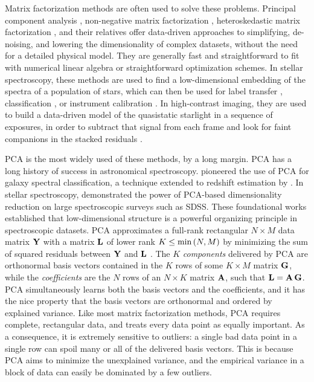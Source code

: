 \documentclass[onecolumn,floatfix,linenumbers,trackchanges]{aastex631}
\begin{document}
Matrix factorization methods are often used to solve these problems. Principal component analysis \citep[PCA;][]{pearson1901, hotelling1933}, non-negative matrix factorization \citep{lee1999}, heteroskedastic matrix factorization \citep{tsalmantza2012}, and their relatives offer data-driven approaches to simplifying, de-noising, and lowering the dimensionality of complex datasets, without the need for a detailed physical model.
They are generally fast and straightforward to fit with numerical linear algebra or straightforward optimization schemes.
In stellar spectroscopy, these methods are used to find a low-dimensional embedding of the spectra of a population of stars, which can then be used for label transfer \citep{ness2015,casey2016}, classification \citep{refiorentin2007}, or instrument calibration \citep{zhao2021,casey2026}.
In high-contrast imaging, they are used to build a data-driven model of the quasistatic starlight in a sequence of exposures, in order to subtract that signal from each frame and look for faint companions in the stacked residuals \citep{soummer2012, amara2012, fergus2014}.

PCA is the most widely used of these methods, by a long margin. PCA has a long history of success in astronomical spectroscopy. \citet{connolly1995} pioneered the use of PCA for galaxy spectral classification, a technique extended to redshift estimation by \citet{connolly1999}. In stellar spectroscopy, \citet{yip2004} demonstrated the power of PCA-based dimensionality reduction on large spectroscopic surveys such as SDSS. These foundational works established that low-dimensional structure is a powerful organizing principle in spectroscopic datasets. PCA approximates a full-rank rectangular $N \times M$ data matrix ${\bf Y}$ with a matrix ${\bf L}$ of lower rank $K \le {\rm min} \, (N, M)$ by minimizing the sum of squared residuals between ${\bf Y}$ and ${\bf L}$ \citep{eckart1936}.
The $K$ \emph{components} delivered by PCA are orthonormal basis vectors contained in the $K$ rows of some $K \times M$ matrix ${\bf G}$, while the \emph{coefficients} are the $N$ rows of an $N \times K$ matrix ${\bf A}$, such that ${\bf L} = {\bf A}\,{\bf G}$.
PCA simultaneously learns both the basis vectors and the coefficients, and it has the nice property that the basis vectors are orthonormal and ordered by explained variance. Like most matrix factorization methods, PCA requires complete, rectangular data, and treats every data point as equally important. As a consequence, it is extremely sensitive to outliers: a single bad data point in a single row can spoil many or all of the delivered basis vectors.
This is because PCA aims to minimize the unexplained variance, and the empirical variance in a block of data can easily be dominated by a few outliers.
\end{document}
